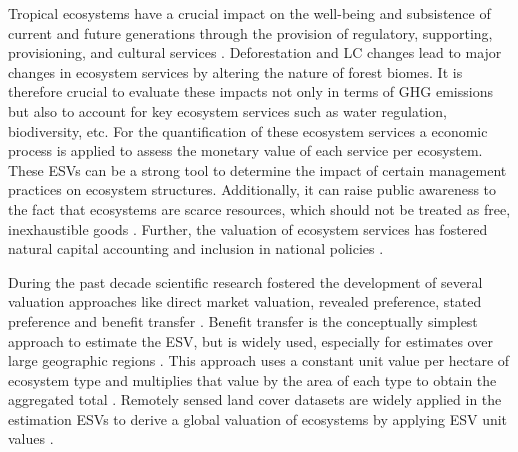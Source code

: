 	Tropical ecosystems have a crucial impact on the well-being and subsistence of current and future generations through the provision of regulatory, supporting, provisioning, and cultural services \citep{Costanza1997}. Deforestation and \ac{LC} changes lead to major changes in ecosystem services by altering the nature of forest biomes. It is therefore crucial to evaluate these impacts not only in terms of \ac{GHG} emissions but also to account for key ecosystem services such as water regulation, biodiversity, etc. For the quantification of these ecosystem services a economic process is applied to assess the monetary value of each service per ecosystem. These \acp{ESV} can be a strong tool to determine the impact of certain management practices on ecosystem structures. Additionally, it can raise public awareness to the fact that ecosystems are scarce resources, which should not be treated as free, inexhaustible goods \citep{Groot2012}. Further, the valuation of ecosystem services has fostered natural capital accounting and inclusion in national policies \citep{Song2018}. 

	During the past decade scientific research fostered the development of several valuation approaches like direct market valuation, revealed preference, stated preference and benefit transfer \citep{Song2018}. Benefit transfer is the conceptually simplest approach to estimate the \ac{ESV}, but is widely used, especially for estimates over large geographic regions \citep{Costanza1997,Song2018,Costanza2014}. This approach uses a constant unit value per hectare of ecosystem type and multiplies that value by the area of each type to obtain the aggregated total \citep{Costanza2014}. Remotely sensed land cover datasets are widely applied in the estimation \acp{ESV} to derive a global valuation of ecosystems by applying \ac{ESV} unit values \citep{Song2018}.

